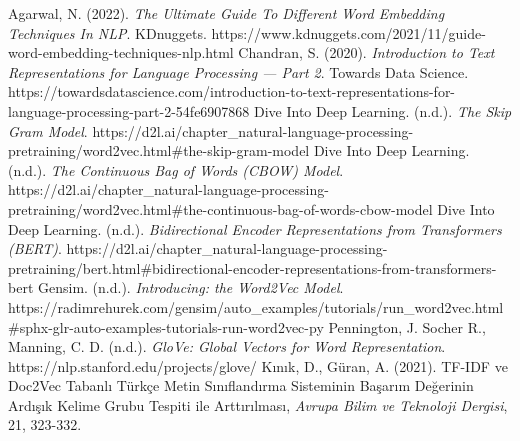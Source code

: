 \documentclass[man]{apa7}
\begin{document}
\newpage
\begin{thebibliography}{7}
Agarwal, N. (2022). \emph{The Ultimate Guide To Different Word Embedding Techniques In NLP}. KDnuggets. https://www.kdnuggets.com/2021/11/guide-word-embedding-techniques-nlp.html
Chandran, S. (2020). \emph{Introduction to Text Representations for Language Processing — Part 2}. Towards Data Science. https://towardsdatascience.com/introduction-to-text-representations-for-language-processing-part-2-54fe6907868
Dive Into Deep Learning. (n.d.). \emph{The Skip Gram Model}. https://d2l.ai/chapter\_natural-language-processing-pretraining/word2vec.html\#the-skip-gram-model
Dive Into Deep Learning. (n.d.). \emph{The Continuous Bag of Words (CBOW) Model}. https://d2l.ai/chapter\_natural-language-processing-pretraining/word2vec.html\#the-continuous-bag-of-words-cbow-model
Dive Into Deep Learning. (n.d.). \emph{Bidirectional Encoder Representations from Transformers (BERT)}. https://d2l.ai/chapter\_natural-language-processing-pretraining/bert.html\#bidirectional-encoder-representations-from-transformers-bert
Gensim. (n.d.). \emph{Introducing: the Word2Vec Model}.
https://radimrehurek.com/gensim/auto\_examples/tutorials/run\_word2vec.html\#sphx-glr-auto-examples-tutorials-run-word2vec-py
Pennington, J. Socher R., Manning, C. D. (n.d.). \emph{GloVe: Global Vectors for Word Representation}. https://nlp.stanford.edu/projects/glove/
Kınık, D., Güran, A. (2021). TF-IDF ve Doc2Vec Tabanlı Türkçe Metin Sınıflandırma Sisteminin
Başarım Değerinin Ardışık Kelime Grubu Tespiti ile Arttırılması, \emph{Avrupa Bilim ve Teknoloji Dergisi}, 21, 323-332.
\end{thebibliography}
\end{document}
